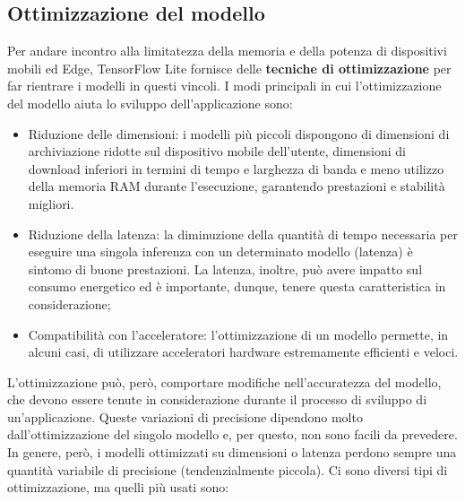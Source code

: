 \subsection{Ottimizzazione del modello}
Per andare incontro alla limitatezza della memoria e della potenza di dispositivi mobili ed Edge, TensorFlow Lite fornisce delle \textbf{tecniche
di ottimizzazione} per far rientrare i modelli in questi vincoli.
I modi principali in cui l’ottimizzazione del modello aiuta lo sviluppo dell’applicazione sono:
\begin{itemize}
    \item Riduzione delle dimensioni: i modelli più piccoli dispongono di dimensioni di archiviazione ridotte sul dispositivo mobile dell’utente,
    dimensioni di download inferiori in termini di tempo e larghezza di banda e meno utilizzo della memoria RAM durante l’esecuzione, garantendo
    prestazioni e stabilità migliori.
    \item Riduzione della latenza: la diminuzione della quantità di tempo necessaria per eseguire una singola inferenza con un determinato modello
    (latenza) è sintomo di buone prestazioni. La latenza, inoltre, può avere impatto sul consumo energetico ed è importante, dunque, tenere questa
    caratteristica in considerazione;
    \item Compatibilità con l’acceleratore: l’ottimizzazione di un modello permette, in alcuni casi, di utilizzare acceleratori hardware estremamente
    efficienti e veloci.
\end{itemize}
L’ottimizzazione può, però, comportare modifiche nell’accuratezza del modello, che devono essere tenute in considerazione durante il processo di sviluppo di
un’applicazione. Queste variazioni di precisione dipendono molto dall’ottimizzazione del singolo modello e, per questo, non sono facili da prevedere.
In genere, però, i modelli ottimizzati su dimensioni o latenza perdono sempre una quantità variabile di precisione (tendenzialmente piccola). 
Ci sono diversi tipi di ottimizzazione, ma quelli più usati sono:
